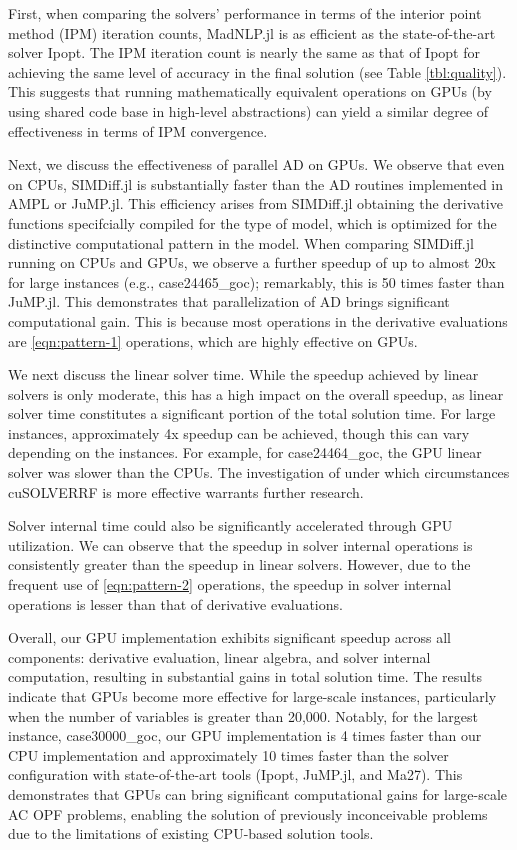 First, when comparing the solvers' performance in terms of the
interior point method (IPM) iteration counts, MadNLP.jl is as
efficient as the state-of-the-art solver Ipopt. The IPM iteration
count is nearly the same as that of Ipopt for achieving the same level
of accuracy in the final solution (see Table \ref{tbl:quality}). This
suggests that running mathematically equivalent operations on GPUs (by
using shared code base in high-level abstractions) can yield a similar
degree of effectiveness in terms of IPM convergence.

Next, we discuss the effectiveness of parallel AD on GPUs. We observe
that even on CPUs, SIMDiff.jl is substantially faster than the AD
routines implemented in AMPL or JuMP.jl. This efficiency arises from
SIMDiff.jl obtaining the derivative functions specifcially compiled
for the type of model, which is optimized for the distinctive
computational pattern in the model. When comparing SIMDiff.jl running
on CPUs and GPUs, we observe a further speedup of up to almost 20x for
large instances (e.g., case24465\_goc); remarkably, this is 50 times
faster than JuMP.jl. This demonstrates that parallelization of AD
brings significant computational gain.
This is because most operations in the derivative
evaluations are \ref{eqn:pattern-1}
operations, which are highly effective on GPUs.

We next discuss the linear solver time.  While the speedup achieved by
linear solvers is only moderate, this has a high impact on the overall
speedup, as linear solver time constitutes a significant portion of
the total solution time. For large instances, approximately 4x speedup
can be achieved, though this can vary depending on the instances. For
example, for case24464\_goc, the GPU linear solver was slower than the
CPUs. The investigation of under which circumstances cuSOLVERRF is
more effective warrants further research.

Solver internal time could also be significantly accelerated through
GPU utilization. We can observe that the speedup in solver internal
operations is consistently greater than the speedup in linear
solvers. However, due to the frequent use of \ref{eqn:pattern-2}
operations, the speedup in solver internal operations is lesser than
that of derivative evaluations.

Overall, our GPU implementation exhibits significant speedup across
all components: derivative evaluation, linear algebra, and solver
internal computation, resulting in substantial gains in total solution
time. The results indicate that GPUs become more effective for
large-scale instances, particularly when the number of variables is
greater than 20,000. Notably, for the largest instance,
case30000\_goc, our GPU implementation is 4 times faster than our CPU
implementation and approximately 10 times faster than the solver
configuration with state-of-the-art tools (Ipopt, JuMP.jl, and
Ma27). This demonstrates that GPUs can bring significant computational
gains for large-scale AC OPF problems, enabling the solution of
previously inconceivable problems due to the limitations of existing
CPU-based solution tools.


